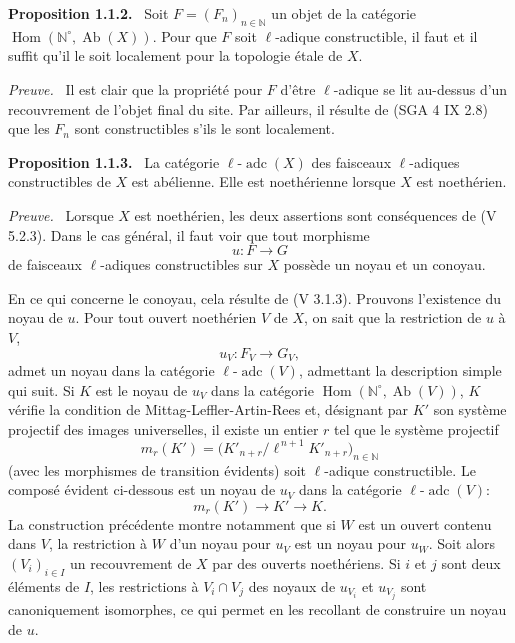 \documentclass[11pt]{article}
\newenvironment{statement}[1]{\par\medskip\noindent\textbf{#1.}\ }{\par\medskip}
\newenvironment{prooftext}[1][Proof]{\par\noindent\emph{#1.}\ }{\par\medskip}
\DeclareMathOperator{\Hom}{Hom}
\providecommand{\Hom}{\operatorname{Hom}}
\providecommand{\Ab}{\operatorname{Ab}}
\providecommand{\adc}{\operatorname{adc}}
\providecommand{\Ab}{\operatorname{Ab}}
\providecommand{\Hom}{\operatorname{Hom}}
\begin{document}
\begin{statement}{Proposition 1.1.2}
Soit \(F=(F_n)_{n\in\mathbb N}\) un objet de la catégorie \(\Hom(\mathbb N^\circ,\Ab(X))\). Pour que \(F\) soit \(\ell\)-adique constructible, il faut et il suffit qu'il le soit localement pour la topologie étale de \(X\).
\end{statement}

\begin{prooftext}[Preuve]
Il est clair que la propriété pour \(F\) d'être \(\ell\)-adique se lit au-dessus d'un recouvrement de l'objet final du site. Par ailleurs, il résulte de (SGA 4 IX 2.8) que les \(F_n\) sont constructibles s'ils le sont localement.
\end{prooftext}

\begin{statement}{Proposition 1.1.3}
La catégorie \(\ell\text{-}\adc(X)\) des faisceaux \(\ell\)-adiques constructibles de \(X\) est abélienne. Elle est noethérienne lorsque \(X\) est noethérien.
\end{statement}

\begin{prooftext}[Preuve]
Lorsque \(X\) est noethérien, les deux assertions sont conséquences de (V 5.2.3). Dans le cas général, il faut voir que tout morphisme
\[
u:F\longrightarrow G
\]
de faisceaux \(\ell\)-adiques constructibles sur \(X\) possède un noyau et un conoyau.

En ce qui concerne le conoyau, cela résulte de (V 3.1.3). Prouvons l'existence du noyau de \(u\). Pour tout ouvert noethérien \(V\) de \(X\), on sait que la restriction de \(u\) à \(V\),
\[
u_V:F_V\longrightarrow G_V,
\]
admet un noyau dans la catégorie \(\ell\text{-}\adc(V)\), admettant la description simple qui suit. Si \(K\) est le noyau de \(u_V\) dans la catégorie \(\Hom(\mathbb N^\circ,\Ab(V))\), \(K\) vérifie la condition de Mittag-Leffler-Artin-Rees et, désignant par \(K'\) son système projectif des images universelles, il existe un entier \(r\) tel que le système projectif
\[
m_r(K')=\bigl(K'_{n+r}/\ell^{\,n+1}K'_{n+r}\bigr)_{n\in\mathbb N}
\]
(avec les morphismes de transition évidents) soit \(\ell\)-adique constructible. Le composé évident ci-dessous est un noyau de \(u_V\) dans la catégorie \(\ell\text{-}\adc(V)\):
\[
m_r(K')\longrightarrow K'\longrightarrow K.
\]
La construction précédente montre notamment que si \(W\) est un ouvert contenu dans \(V\), la restriction à \(W\) d'un noyau pour \(u_V\) est un noyau pour \(u_W\). Soit alors \((V_i)_{i\in I}\) un recouvrement de \(X\) par des ouverts noethériens. Si \(i\) et \(j\) sont deux éléments de \(I\), les restrictions à \(V_i\cap V_j\) des noyaux de \(u_{V_i}\) et \(u_{V_j}\) sont canoniquement isomorphes, ce qui permet en les recollant de construire un noyau de \(u\).
\end{prooftext}
\end{document}
